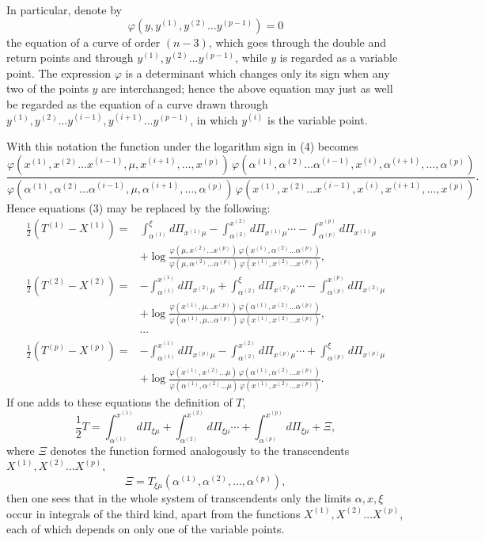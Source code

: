 \documentclass[10pt]{article}
\begin{document}
In particular, denote by
\[
\varphi(y,y^{(1)},y^{(2)}\ldots y^{(p-1)})=0
\]
the equation of a curve of order \((n-3)\), which goes through the double and return points and through \(y^{(1)},y^{(2)}\ldots y^{(p-1)}\), while \(y\) is regarded as a variable point. The expression \(\varphi\) is a determinant which changes only its sign when any two of the points \(y\) are interchanged; hence the above equation may just as well be regarded as the equation of a curve drawn through \(y^{(1)},y^{(2)}\ldots y^{(i-1)},y^{(i+1)}\ldots y^{(p-1)}\), in which \(y^{(i)}\) is the variable point.

With this notation the function under the logarithm sign in (4) becomes
\begingroup\scriptsize
\[
\frac{\varphi(x^{(1)},x^{(2)}\ldots x^{(i-1)},\mu,x^{(i+1)},\ldots,x^{(p)})\,
\varphi(\alpha^{(1)},\alpha^{(2)}\ldots\alpha^{(i-1)},x^{(i)},\alpha^{(i+1)},\ldots,\alpha^{(p)})}
{\varphi(\alpha^{(1)},\alpha^{(2)}\ldots\alpha^{(i-1)},\mu,\alpha^{(i+1)},\ldots,\alpha^{(p)})\,
\varphi(x^{(1)},x^{(2)}\ldots x^{(i-1)},x^{(i)},x^{(i+1)},\ldots,x^{(p)})}.
\]
\endgroup
Hence equations (3) may be replaced by the following:
\begingroup\scriptsize
\[
\begin{aligned}
\frac12(T^{(1)}-X^{(1)})={}&\int_{\alpha^{(1)}}^{\xi}d\Pi_{x^{(1)}\mu}
-\int_{\alpha^{(2)}}^{x^{(2)}}d\Pi_{x^{(1)}\mu}\cdots
-\int_{\alpha^{(p)}}^{x^{(p)}}d\Pi_{x^{(1)}\mu} \\
&+\log\frac{\varphi(\mu,x^{(2)}\ldots x^{(p)})\,\varphi(x^{(1)},\alpha^{(2)}\ldots\alpha^{(p)})}
{\varphi(\mu,\alpha^{(2)}\ldots\alpha^{(p)})\,\varphi(x^{(1)},x^{(2)}\ldots x^{(p)})},\\[0.4em]
\frac12(T^{(2)}-X^{(2)})={}&-\int_{\alpha^{(1)}}^{x^{(1)}}d\Pi_{x^{(2)}\mu}
+\int_{\alpha^{(2)}}^{\xi}d\Pi_{x^{(2)}\mu}\cdots
-\int_{\alpha^{(p)}}^{x^{(p)}}d\Pi_{x^{(2)}\mu} \\
&+\log\frac{\varphi(x^{(1)},\mu\ldots x^{(p)})\,\varphi(\alpha^{(1)},x^{(2)}\ldots\alpha^{(p)})}
{\varphi(\alpha^{(1)},\mu\ldots\alpha^{(p)})\,\varphi(x^{(1)},x^{(2)}\ldots x^{(p)})},\\[-0.2em]
&\cdots\\[-0.2em]
\frac12(T^{(p)}-X^{(p)})={}&-\int_{\alpha^{(1)}}^{x^{(1)}}d\Pi_{x^{(p)}\mu}
-\int_{\alpha^{(2)}}^{x^{(2)}}d\Pi_{x^{(p)}\mu}\cdots
+\int_{\alpha^{(p)}}^{\xi}d\Pi_{x^{(p)}\mu} \\
&+\log\frac{\varphi(x^{(1)},x^{(2)}\ldots\mu)\,\varphi(\alpha^{(1)},\alpha^{(2)}\ldots x^{(p)})}
{\varphi(\alpha^{(1)},\alpha^{(2)}\ldots\mu)\,\varphi(x^{(1)},x^{(2)}\ldots x^{(p)})}.
\end{aligned}
\]
\endgroup
If one adds to these equations the definition of \(T\),
\[
\frac12T=\int_{\alpha^{(1)}}^{x^{(1)}}d\Pi_{\xi\mu}
+\int_{\alpha^{(2)}}^{x^{(2)}}d\Pi_{\xi\mu}\cdots
+\int_{\alpha^{(p)}}^{x^{(p)}}d\Pi_{\xi\mu}+\Xi,
\]
where \(\Xi\) denotes the function formed analogously to the transcendents \(X^{(1)},X^{(2)}\ldots X^{(p)}\),
\[
\Xi=T_{\xi\mu}(\alpha^{(1)},\alpha^{(2)},\ldots,\alpha^{(p)}),
\]
then one sees that in the whole system of transcendents only the limits \(\alpha,x,\xi\) occur in integrals of the third kind, apart from the functions \(X^{(1)},X^{(2)}\ldots X^{(p)}\), each of which depends on only one of the variable points.
\end{document}
